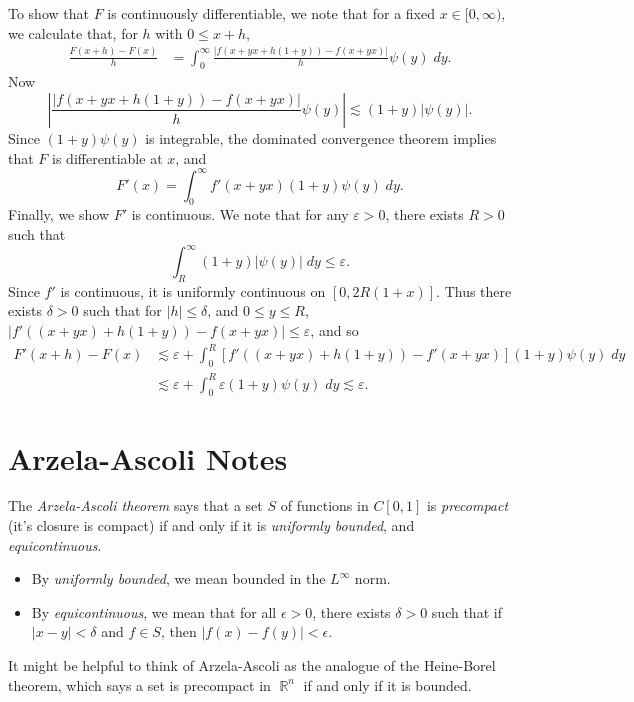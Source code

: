 \documentclass[answers]{exam}
\DeclareMathOperator{\RR}{\mathbb{R}}
\begin{document}
\begin{questions}
\begin{solution}
    To show that $F$ is continuously differentiable, we note that for a fixed $x \in [0,\infty)$, we calculate that, for $h$ with $0 \leq x + h$,
    \begin{align*}
        \frac{F(x+h) - F(x)}{h} &= \int_0^\infty \frac{|f(x+yx + h(1 + y)) - f(x + yx)|}{h} \psi(y)\; dy.
    \end{align*}
    Now
    \[ \left| \frac{|f(x+yx + h(1 + y)) - f(x + yx)|}{h} \psi(y) \right| \lesssim (1 + y) |\psi(y)|. \]
    Since $(1 + y) \psi(y)$ is integrable, the dominated convergence theorem implies that $F$ is differentiable at $x$, and
    \[ F'(x) = \int_0^\infty f'(x + yx) (1 + y) \psi(y)\; dy. \]
    Finally, we show $F'$ is continuous. We note that for any $\varepsilon > 0$, there exists $R > 0$ such that
    \[ \int_R^\infty (1 + y) |\psi(y)|\; dy \leq \varepsilon. \]
    Since $f'$ is continuous, it is uniformly continuous on $[0,2R(1 + x)]$. Thus there exists $\delta > 0$ such that for $|h| \leq \delta$, and $0 \leq y \leq R$, $|f'((x + yx) + h(1 + y)) - f(x + yx)| \leq \varepsilon$, and so
    \begin{align*}
        F'(x+h) - F(x) &\lesssim \varepsilon + \int_0^R [f'((x + yx) + h(1 + y)) - f'(x + yx)] (1 + y) \psi(y)\; dy\\
        &\lesssim \varepsilon + \int_0^R \varepsilon (1 + y) \psi(y)\; dy \lesssim \varepsilon.
    \end{align*}
\end{solution}




\newpage
\section{Arzela-Ascoli Notes}

The \emph{Arzela-Ascoli theorem} says that a set $S$ of functions in $C[0,1]$ is \emph{precompact} (it's closure is compact) if and only if it is \emph{uniformly bounded}, and \emph{equicontinuous}. 
%
\begin{itemize}
	\item By \textit{uniformly bounded}, we mean bounded in the $L^\infty$ norm.

	\item By \textit{equicontinuous}, we mean that for all $\epsilon>0$, there exists $\delta > 0$ such that if $|x - y| < \delta$ and $f \in S$, then $|f(x) - f(y)| < \epsilon$.
\end{itemize}
%
It might be helpful to think of Arzela-Ascoli as the analogue of the Heine-Borel theorem, which says a set is precompact in $\RR^n$ if and only if it is bounded.


\end{questions}
\end{document}
